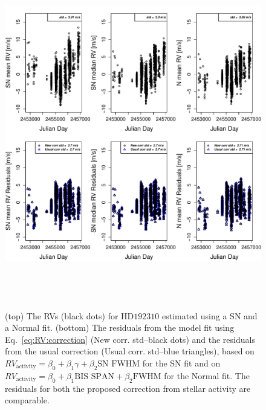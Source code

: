 \documentclass{aa}
\begin{document}
\begin{figure} 
\begin{center}
\includegraphics[height = 6in]{NEW_CORRECTIONHD19231_[3]CorrectionActivity_RadialVelocity_vs_time.pdf} 
   \caption{(top) The RVs (black dots) for $\text{HD}192310$ estimated using a SN and a Normal fit.
 (bottom) The residuals from the model fit using Eq.~\eqref{eq:RV:correction} (New corr. std--black dots) and the residuals from the usual correction (Usual corr. std--blue triangles), based on $RV_{\text{activity}}=\beta_0+\beta_1 \gamma + \beta_2 \text{SN FWHM}$ for the SN fit and on $RV_{\text{activity}}=\beta_0+\beta_1 \text{BIS SPAN} + \beta_2 \text{FWHM}$ for the Normal fit. The residuals for both the proposed correction from stellar activity are comparable.
 }
   \label{fig:HD192310:correctionRV}
\end{center}
\end{figure}
\end{document}
